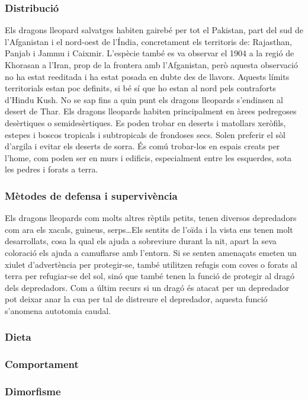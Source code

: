 \subsubsection{Distribució}
Els dragons lleopard salvatges habiten gairebé per tot el Pakistan, part del sud de l'Afganistan i el nord-oest de l'Índia, concretament els territoris de: Rajasthan, Panjab i Jammu i Caixmir. L'espècie també es va observar el 1904 a la regió de Khorasan a l'Iran, prop de la frontera amb l'Afganistan, però aquesta observació no ha estat reeditada i ha estat posada en dubte des de llavors. Aquests límits territorials estan poc definits, si bé sí que ho estan al nord pels contraforts d'Hindu Kush. No se sap fins a quin punt els dragons lleopards s'endinsen al desert de Thar. Els dragons lleopards habiten principalment en àrees pedregoses desèrtiques o semidesèrtiques. Es poden trobar en deserts i matollars xeròfils, estepes i boscos tropicals i subtropicals de frondoses secs. Solen preferir el sòl d'argila i evitar els deserts de sorra. És comú trobar-los en espais creats per l'home, com poden ser en murs i edificis, especialment entre les esquerdes, sota les pedres i forats a terra.

\subsubsection{Mètodes de defensa i supervivència}
Els dragons lleopards com molts altres rèptils petits, tenen diversos depredadors com ara els xacals, guineus, serps\dots Els sentits de l'oïda i la vista ens tenen molt desarrollats, cosa la qual els ajuda a sobreviure durant la nit, apart la seva coloració els ajuda a camuflarse amb l’entorn. Si se senten amenaçats emeten un xiulet d’advertència per protegir-se, també utilitzen refugis com coves o forats al terra per refugiar-se del sol, sinó que també tenen la funció de protegir al dragó dels depredadors. Com a últim recurs si un dragó és atacat per un depredador pot deixar anar la cua per tal de distreure el depredador, aquesta funció s’anomena autotomia caudal.

\subsubsection{Dieta}
\subsubsection{Comportament} 
\subsubsection{Dimorfisme} 
